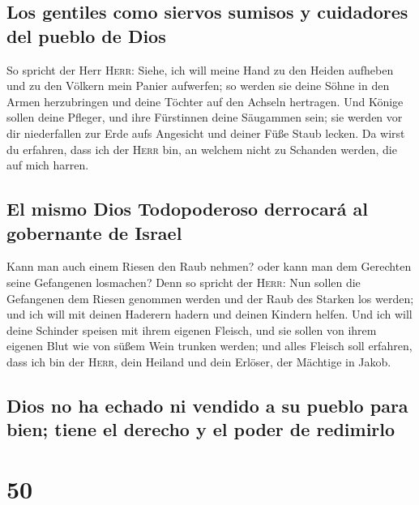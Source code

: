 \hypertarget{los-gentiles-como-siervos-sumisos-y-cuidadores-del-pueblo-de-dios}{%
\subsection{Los gentiles como siervos sumisos y cuidadores del pueblo de
Dios}\label{los-gentiles-como-siervos-sumisos-y-cuidadores-del-pueblo-de-dios}}

 So spricht der Herr \textsc{Herr}: Siehe, ich will meine
Hand zu den Heiden aufheben und zu den Völkern mein Panier aufwerfen; so
werden sie deine Söhne in den Armen herzubringen und deine Töchter auf
den Achseln hertragen.  Und Könige sollen deine Pfleger,
und ihre Fürstinnen deine Säugammen sein; sie werden vor dir
niederfallen zur Erde aufs Angesicht und deiner Füße Staub lecken. Da
wirst du erfahren, dass ich der \textsc{Herr} bin, an welchem nicht zu
Schanden werden, die auf mich harren.

\hypertarget{el-mismo-dios-todopoderoso-derrocaruxe1-al-gobernante-de-israel}{%
\subsection{El mismo Dios Todopoderoso derrocará al gobernante de
Israel}\label{el-mismo-dios-todopoderoso-derrocaruxe1-al-gobernante-de-israel}}

 Kann man auch einem Riesen den Raub nehmen? oder kann
man dem Gerechten seine Gefangenen losmachen?  Denn so
spricht der \textsc{Herr}: Nun sollen die Gefangenen dem Riesen genommen
werden und der Raub des Starken los werden; und ich will mit deinen
Haderern hadern und deinen Kindern helfen.  Und ich will
deine Schinder speisen mit ihrem eigenen Fleisch, und sie sollen von
ihrem eigenen Blut wie von süßem Wein trunken werden; und alles Fleisch
soll erfahren, dass ich bin der \textsc{Herr}, dein Heiland und dein
Erlöser, der Mächtige in Jakob.

\hypertarget{dios-no-ha-echado-ni-vendido-a-su-pueblo-para-bien-tiene-el-derecho-y-el-poder-de-redimirlo}{%
\subsection{Dios no ha echado ni vendido a su pueblo para bien; tiene el
derecho y el poder de
redimirlo}\label{dios-no-ha-echado-ni-vendido-a-su-pueblo-para-bien-tiene-el-derecho-y-el-poder-de-redimirlo}}

\hypertarget{section-49}{%
\section{50}\label{section-49}}

